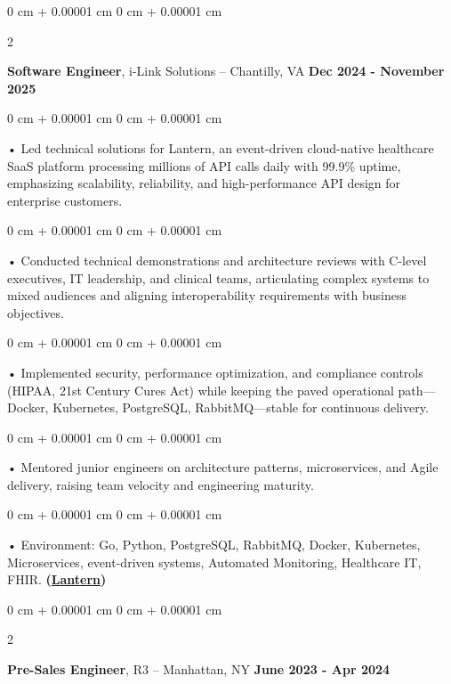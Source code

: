 \documentclass[10pt, letterpaper]{article}
\newenvironment{onecolentry}{
    \begin{adjustwidth}{
        0 cm + 0.00001 cm
    }{
        0 cm + 0.00001 cm
    }
}{
    \end{adjustwidth}
} %
\newenvironment{twocolentry}[2][]{
    \onecolentry
    \def\secondColumn{#2}
    \setcolumnwidth{\fill, 4.5 cm}
    \begin{paracol}{2}
}{
    \switchcolumn \raggedleft \secondColumn
    \end{paracol}
    \endonecolentry
} %
\begin{document}
        \vspace{0.1cm}

        \begin{twocolentry}{
            \textbf{Dec 2024 - November 2025}
        }
            \textbf{Software Engineer}, i-Link Solutions -- Chantilly, VA\end{twocolentry}


        \begin{onecolentry}
             • Led technical solutions for Lantern, an event-driven cloud-native healthcare SaaS platform processing millions of API calls daily with 99.9\% uptime, emphasizing scalability, reliability, and high-performance API design for enterprise customers.
        \end{onecolentry}
        \begin{onecolentry}
             • Conducted technical demonstrations and architecture reviews with C-level executives, IT leadership, and clinical teams, articulating complex systems to mixed audiences and aligning interoperability requirements with business objectives.
        \end{onecolentry}
        \begin{onecolentry}
             • Implemented security, performance optimization, and compliance controls (HIPAA, 21st Century Cures Act) while keeping the paved operational path---Docker, Kubernetes, PostgreSQL, RabbitMQ---stable for continuous delivery.
        \end{onecolentry}
        \begin{onecolentry}
             • Mentored junior engineers on architecture patterns, microservices, and Agile delivery, raising team velocity and engineering maturity.
        \end{onecolentry}

        \begin{onecolentry}
             • Environment: Go, Python, PostgreSQL, RabbitMQ, Docker, Kubernetes, Microservices, event-driven systems, Automated Monitoring, Healthcare IT, FHIR. \textbf{(\href{https://lantern.healthit.gov/?tab=dashboard_tab}{Lantern})}
        \end{onecolentry}
        \vspace{0.1cm}

        \begin{twocolentry}{
            \textbf{June 2023 - Apr 2024}
        }
            \textbf{Pre-Sales Engineer}, R3 -- Manhattan, NY\end{twocolentry}
\end{document}

